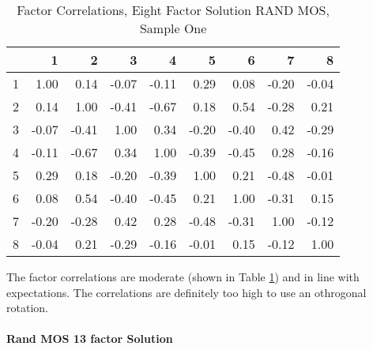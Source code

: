 \documentclass{article}
\begin{document}
\begin{table}[ht]
\centering
\begin{tabular}{rrrrrrrrr}
  \hline
 & 1 & 2 & 3 & 4 & 5 & 6 & 7 & 8 \\ 
  \hline
1 & 1.00 & 0.14 & -0.07 & -0.11 & 0.29 & 0.08 & -0.20 & -0.04 \\ 
  2 & 0.14 & 1.00 & -0.41 & -0.67 & 0.18 & 0.54 & -0.28 & 0.21 \\ 
  3 & -0.07 & -0.41 & 1.00 & 0.34 & -0.20 & -0.40 & 0.42 & -0.29 \\ 
  4 & -0.11 & -0.67 & 0.34 & 1.00 & -0.39 & -0.45 & 0.28 & -0.16 \\ 
  5 & 0.29 & 0.18 & -0.20 & -0.39 & 1.00 & 0.21 & -0.48 & -0.01 \\ 
  6 & 0.08 & 0.54 & -0.40 & -0.45 & 0.21 & 1.00 & -0.31 & 0.15 \\ 
  7 & -0.20 & -0.28 & 0.42 & 0.28 & -0.48 & -0.31 & 1.00 & -0.12 \\ 
  8 & -0.04 & 0.21 & -0.29 & -0.16 & -0.01 & 0.15 & -0.12 & 1.00 \\ 
   \hline
\end{tabular}
\caption{Factor Correlations, Eight Factor Solution RAND MOS, Sample One} 
\label{tab:hom1rand8corr}
\end{table}
The factor correlations are moderate (shown in Table \ref{tab:hom1rand8corr}) and in line with expectations. The correlations are definitely too high to use an othrogonal rotation. 



\paragraph{Rand MOS 13 factor Solution}
\end{document}

